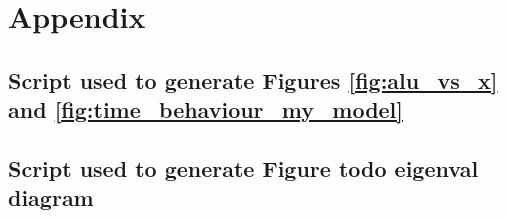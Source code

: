 \newpage

\section*{Appendix}
\subsection*{Script used to generate Figures \ref{fig:alu_vs_x} and \ref{fig:time_behaviour_my_model}}

%

\subsection*{Script used to generate Figure \textbf{todo eigenval diagram}}
